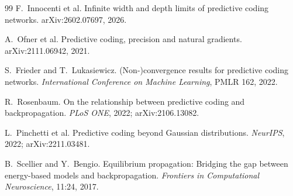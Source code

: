 \documentclass[11pt]{article}
\begin{document}
\begin{thebibliography}{99}
 F.~Innocenti et al.
Infinite width and depth limits of predictive coding networks. arXiv:2602.07697, 2026.

 A.~Ofner et al.
Predictive coding, precision and natural gradients. arXiv:2111.06942, 2021.

 S.~Frieder and T.~Lukasiewicz.
(Non-)convergence results for predictive coding networks.
\emph{International Conference on Machine Learning}, PMLR 162, 2022.

 R.~Rosenbaum.
On the relationship between predictive coding and backpropagation.
\emph{PLoS ONE}, 2022; arXiv:2106.13082.

 L.~Pinchetti et al.
Predictive coding beyond Gaussian distributions. \emph{NeurIPS}, 2022; arXiv:2211.03481.

 B.~Scellier and Y.~Bengio.
Equilibrium propagation: Bridging the gap between energy-based models and
backpropagation. \emph{Frontiers in Computational Neuroscience}, 11:24, 2017.

\end{thebibliography}
\end{document}
